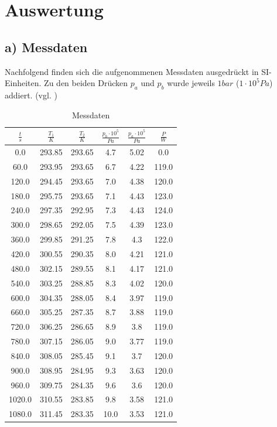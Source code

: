 \section{Auswertung}
\label{sec:Auswertung}
\subsection{a) Messdaten}
\label{sec:messdaten}
Nachfolgend finden sich die aufgenommenen Messdaten ausgedrückt in SI-Einheiten. Zu den beiden Drücken $p_a$ und $p_b$ wurde jeweils $1 bar$ ($1\cdot10^5 Pa$) addiert. (vgl. \cite{Anleitung})
\begin{table}
  \centering
  \caption{Messdaten}

  \label{tab:Messdaten}
\begin{tabular}{cccccc}
\toprule
$\frac{t}{s}$ & $\frac{T_1}{K}$ & $\frac{T_2}{K}$& $\frac{p_b\cdot10^5}{Pa}$ & $\frac{p_a\cdot10^5}{Pa}$ & $\frac{P}{W}$ \\
\midrule
0.0 & 293.85 & 293.65 & 4.7 & 5.02 & 0.0 \\
60.0 & 293.95 & 293.65 & 6.7 & 4.22 & 119.0 \\
120.0 & 294.45 & 293.65 & 7.0 & 4.38 & 120.0 \\
180.0 & 295.75 & 293.65 & 7.1 & 4.43 & 123.0 \\
240.0 & 297.35 & 292.95 & 7.3 & 4.43 & 124.0 \\
300.0 & 298.65 & 292.05 & 7.5 & 4.39 & 123.0 \\
360.0 & 299.85 & 291.25 & 7.8 & 4.3 & 122.0 \\
420.0 & 300.55 & 290.35 & 8.0 & 4.21 & 121.0 \\
480.0 & 302.15 & 289.55 & 8.1 & 4.17 & 121.0 \\
540.0 & 303.25 & 288.85 & 8.3 & 4.02 & 120.0 \\
600.0 & 304.35 & 288.05 & 8.4 & 3.97 & 119.0 \\
660.0 & 305.25 & 287.35 & 8.7 & 3.88 & 119.0 \\
720.0 & 306.25 & 286.65 & 8.9 & 3.8 & 119.0 \\
780.0 & 307.15 & 286.05 & 9.0 & 3.77 & 119.0 \\
840.0 & 308.05 & 285.45 & 9.1 & 3.7 & 120.0 \\
900.0 & 308.95 & 284.95 & 9.3 & 3.63 & 120.0 \\
960.0 & 309.75 & 284.35 & 9.6 & 3.6 & 120.0 \\
1020.0 & 310.55 & 283.85 & 9.8 & 3.58 & 121.0 \\
1080.0 & 311.45 & 283.35 & 10.0 & 3.53 & 121.0 \\

\end{tabular}
\end{table}
